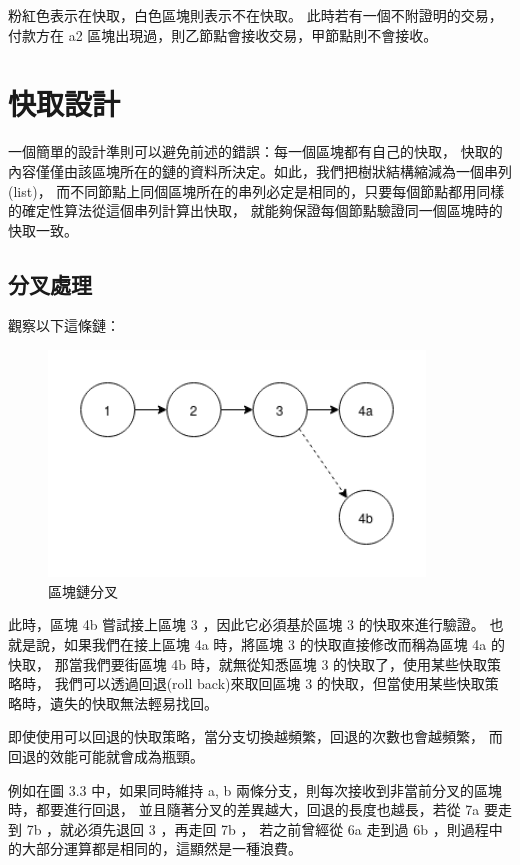 粉紅色表示在快取，白色區塊則表示不在快取。
此時若有一個不附證明的交易，付款方在 a2 區塊出現過，則乙節點會接收交易，甲節點則不會接收。

\section{快取設計}

{\color{red}
一個簡單的設計準則可以避免前述的錯誤：每一個區塊都有自己的快取，
快取的內容僅僅由該區塊所在的鏈的資料所決定。如此，我們把樹狀結構縮減為一個串列(list)，
而不同節點上同個區塊所在的串列必定是相同的，只要每個節點都用同樣的確定性算法從這個串列計算出快取，
就能夠保證每個節點驗證同一個區塊時的快取一致。
}

\subsection{分叉處理}

觀察以下這條鏈：

\begin{figure}[h!]
\includegraphics[width=10cm]{快取分叉}
\caption{區塊鏈分叉}
\end{figure}

此時，區塊 4b 嘗試接上區塊 3 ，因此它必須基於區塊 3 的快取來進行驗證。
也就是說，如果我們在接上區塊 4a 時，將區塊 3 的快取直接修改而稱為區塊 4a 的快取，
那當我們要街區塊 4b 時，就無從知悉區塊 3 的快取了，使用某些快取策略時，
我們可以透過回退(roll back)來取回區塊 3 的快取，但當使用某些快取策略時，遺失的快取無法輕易找回。

即使使用可以回退的快取策略，當分支切換越頻繁，回退的次數也會越頻繁，
而回退的效能可能就會成為瓶頸。

例如在圖 3.3 中，如果同時維持 a, b 兩條分支，則每次接收到非當前分叉的區塊時，都要進行回退，
並且隨著分叉的差異越大，回退的長度也越長，若從 7a 要走到 7b ，就必須先退回 3 ，再走回 7b ，
若之前曾經從 6a 走到過 6b ，則過程中的大部分運算都是相同的，這顯然是一種浪費。

